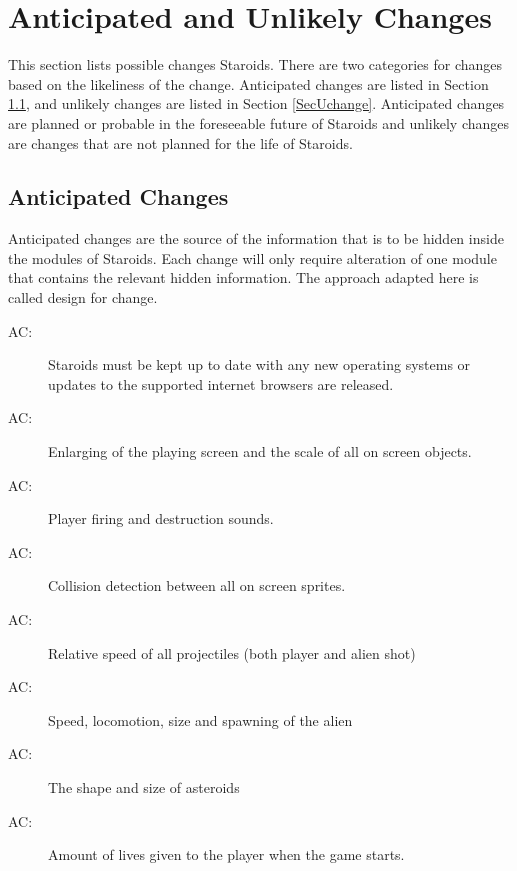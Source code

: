 \documentclass[12pt, titlepage]{article}
\newcounter{acnum}
\newcommand{\actheacnum}{AC\theacnum}
\begin{document}
\section{Anticipated and Unlikely Changes} \label{SecChange}

This section lists possible changes Staroids. There are two categories for changes based on the likeliness of the change. Anticipated changes are listed in Section \ref{SecAchange}, and unlikely changes are listed in Section \ref{SecUchange}. Anticipated changes are planned or probable in the foreseeable future of Staroids and unlikely changes are changes that are not planned for the life of Staroids.

\subsection{Anticipated Changes} \label{SecAchange}

Anticipated changes are the source of the information that is to be hidden inside the modules of Staroids. Each change will only require alteration of one module that contains the relevant hidden information. The approach adapted here is called design for change.

\begin{description}
\item[ \actheacnum \label{acHardware}:] Staroids must be kept up to date with any new operating systems or updates to the supported internet browsers are released.
\item[ \actheacnum \label{acUtilities}:] Enlarging of the playing screen and the scale of all on screen objects.
\item[ \actheacnum \label{acSound}:] Player firing and destruction sounds.
\item[ \actheacnum \label{acGameobject}:] Collision detection between all on screen sprites.
\item[ \actheacnum \label{acGameobject}:] Relative speed of all projectiles (both player and alien shot)
\item[ \actheacnum \label{acGameobject}:] Speed, locomotion, size and spawning of the alien
\item[ \actheacnum \label{acGameobject}:] The shape and size of asteroids
\item[ \actheacnum \label{acGamestate}:] Amount of lives given to the player when the game starts.
\end{description}
\end{document}
